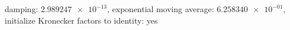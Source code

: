 damping: $\num[scientific-notation=true]{2.989247e-13}$, exponential moving average: $\num[scientific-notation=true]{6.258340e-01}$, initialize Kronecker factors to identity: yes